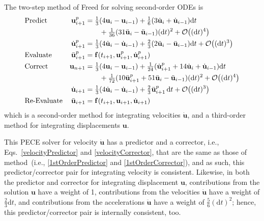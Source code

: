 The two-step method of Freed \cite{Freed17a} for solving second-order ODEs is
\begin{subequations}
    \label{pairedMethods}
    \begin{align}
    \mbox{} & \text{Predict} &
    \mathbf{u}_{i+1}^p & = \tfrac{1}{3} (
    4 \mathbf{u}_i - \mathbf{u}_{i-1} ) + 
    \tfrac{1}{6} ( 3 \dot{\mathbf{u}}_i + 
    \dot{\mathbf{u}}_{i-1} ) \mathrm{d}t \notag \\ 
    \mbox{} & & & \qquad + 
    \tfrac{1}{36} ( 31 \ddot{\mathbf{u}}_i - 
    \ddot{\mathbf{u}}_{i-1} ) (\mathrm{d}t)^2 + 
    \mathcal{O} \bigl( (\mathrm{d}t)^4 \bigr) 
    \label{displacementPredictor} \\
    \mbox{} & &
    \dot{\mathbf{u}}_{i+1}^p & = \tfrac{1}{3} 
    ( 4 \dot{\mathbf{u}}_i - \dot{\mathbf{u}}_{i-1} ) + 
    \tfrac{2}{3} ( 2\ddot{\mathbf{u}}_i - \ddot{\mathbf{u}}_{i-1} )
    \mathrm{d}t + \mathcal{O} \bigl( (\mathrm{d}t)^3 \bigr)
    \label{velocityPredictor} \\
    \mbox{} & \text{Evaluate} &
    \ddot{\mathbf{u}}^p_{i+1} & = \mathbf{f} (t_{i+1}, \mathbf{u}^p_{i+1}, \dot{\mathbf{u}}^p_{i+1}) 
    \label{2ndEvaluate} \\
    \mbox{} & \text{Correct} & 
    \mathbf{u}_{n+1} & = \tfrac{1}{3} (
    4  \mathbf{u}_i - \mathbf{u}_{i-1} ) +
    \tfrac{1}{24} ( \dot{\mathbf{u}}^p_{i+1} +
    14 \dot{\mathbf{u}}_i + \dot{\mathbf{u}}_{i-1} ) \mathrm{d}t 
    \notag \\
    \mbox{} & & & \qquad +
    \tfrac{1}{72} ( 10 \ddot{\mathbf{u}}^p_{i+1} + 
    51 \ddot{\mathbf{u}}_i - \ddot{\mathbf{u}}_{i-1} ) (\mathrm{d}t)^2 + 
    \mathcal{O} \bigl( (\mathrm{d}t)^4 \bigr)
    \label{displacementCorrector} \\ 
    \mbox{} & &
    \dot{\mathbf{u}}_{i+1} & = \tfrac{1}{3} 
    ( 4 \dot{\mathbf{u}}_i - \dot{\mathbf{u}}_{i-1} ) + 
    \tfrac{2}{3} \ddot{\mathbf{u}}^p_{i+1} \, \mathrm{d}t + 
    \mathcal{O} \bigl( (\mathrm{d}t)^3 \bigr)
    \label{velocityCorrector} \\
    \mbox{} & \text{Re-Evaluate} & 
    \ddot{\mathbf{u}}_{i+1} & = \mathbf{f} (t_{i+1}, \mathbf{u}_{i+1}, \dot{\mathbf{u}}_{i+1})
    \label{2ndReEvaluate}
    \end{align}
\end{subequations}
which is a second-order method for integrating velocities $\dot{\mathbf{u}}$, and a third-order method for integrating displacements $\mathbf{u}$.  

This PECE solver for velocity $\dot{\mathbf{u}}$ has a predictor and a corrector, i.e., Eqs.~\ref{velocityPredictor} and \ref{velocityCorrector}, that are the same as those of method~(i.e., \ref{1stOrderPredictor} and \ref{1stOrderCorrector}), and as such, this predictor\slash corrector pair for integrating velocity is consistent.  Likewise, in both the predictor and corrector for integrating displacement $\mathbf{u}$, contributions from the solution $\mathbf{u}$ have a weight of 1, contributions from the velocities $\dot{\mathbf{u}}$ have a weight of $\tfrac{2}{3} \mathrm{d}t$, and contributions from the accelerations $\ddot{\mathbf{u}}$ have a weight of $\tfrac{5}{6} (\mathrm{d}t)^2$; hence, this predictor\slash corrector pair is internally consistent, too.

